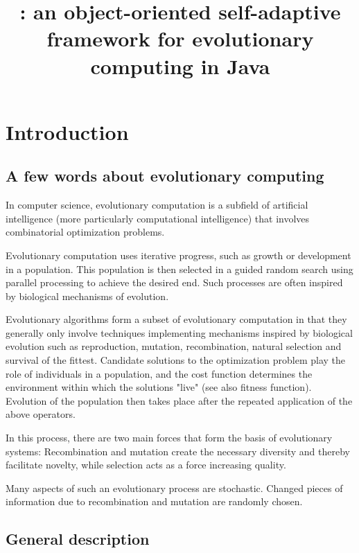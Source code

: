 \documentclass{article}
\title{\drwin: an object-oriented self-adaptive framework for evolutionary
computing in Java}
\begin{document}
\maketitle


\section{Introduction}

\subsection{A few words about evolutionary computing}

In computer science, evolutionary computation is a subfield of artificial intelligence (more particularly
computational intelligence) that involves combinatorial optimization problems.

Evolutionary computation uses iterative progress, such as growth or development in a population. This population
is then selected in a guided random search using parallel processing to achieve the desired end. Such processes are often inspired by biological
mechanisms of evolution.

Evolutionary algorithms form a subset of evolutionary computation in that they generally only involve techniques
implementing mechanisms inspired by biological evolution such as reproduction, mutation, recombination, natural selection and survival of the fittest. Candidate solutions to the optimization problem play the role of individuals in a population, and the cost function determines the environment within which the solutions "live" (see also fitness function). Evolution of the population then takes place after the repeated application of the above operators.

In this process, there are two main forces that form the basis of evolutionary
systems: Recombination and mutation create the necessary diversity and thereby facilitate novelty, while selection acts as a force increasing quality.

Many aspects of such an evolutionary process are stochastic. Changed pieces of information due to recombination and
mutation are randomly chosen.




\subsection{General description}
\end{document}
